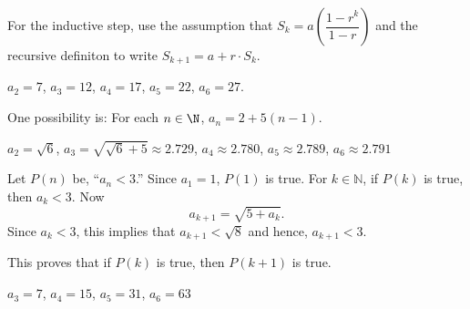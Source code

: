 \begin{list}{\bf{\ref{exer:geometricseries2}.}}
\item For the inductive step, use the assumption that 
$S_k  = a\left( {\dfrac{{1 - r^k }}{{1 - r}}} \right)$ and the recursive definiton to write 
$S_{k + 1}  = a + r \cdot S_k$.
\end{list}


\begin{list}{\bf{\ref{exer:sec53-arithexample}.}}
\item \begin{list}{\bf{(a)}}
\item $a_2 = 7$, $a_3 = 12$, $a_4 = 17$, $a_5 = 22$, $a_6 = 27$.
\end{list}
\end{list}

\begin{list}{}
\item \begin{list}{\bf{(b)}}
\item One possibility is:  For each $n \in \N$, $a_n = 2 + 5(n - 1)$.
\end{list}
\end{list}



\begin{list}{\bf{\ref{exer:sec53-5}.}}
\item \begin{list}{\bf{(a)}}
\item $a_2 = \sqrt{6}$, $a_3 = \sqrt{\sqrt{6} + 5} \approx 2.729$, $a_4 \approx 2.780$, 
$a_5 \approx 2.789$, $a_6 \approx 2.791$
\end{list}
\end{list}


\begin{list}{}
\item \begin{list}{\bf{(b)}}
\item Let $P( n )$ be, ``$a_n < 3$.''  Since $a_1 = 1$, $P( 1 )$ is true.  For $k \in \mathbb{N}$, if $P( k )$ is true, then $a_k < 3$.  Now
\[
a_{k+1} = \sqrt{5 + a_k}.
\] 
Since $a_k < 3$, this implies that $a_{k+1} < \sqrt{8}$ and hence, $a_{k+1} < 3$.

This proves that if $P \left( k \right)$ is true, then $P \left( k + 1\right)$ is true.
\end{list}
\end{list}


\begin{list}{\bf{\ref{exer:sec53-6}.}}
\item \begin{list}{\bf{(a)}}
\item $a_3 = 7$, $a_4 =15$, $a_5 =31$, $a_6 =63$
\end{list}
\end{list}

